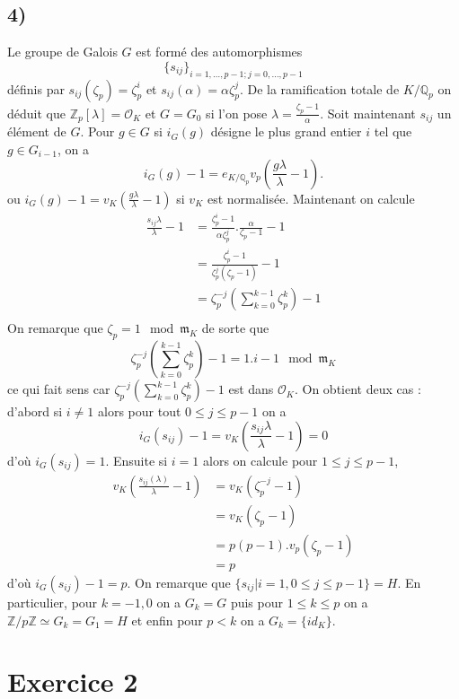 \documentclass[a4paper,12pt]{article}
\newcommand{\Z}{\mathbb{Z}}
\newcommand{\Q}{\mathbb{Q}}
\newcommand{\Or}{\mathcal{O}}
\newcommand{\m}{\mathfrak m}
\theoremstyle{plain}
\theoremstyle{definition}
\theoremstyle{remark}
\begin{document}
\subsection*{4)}
Le groupe de Galois $G$ est formé des automorphismes 
\[\{s_{ij}\}_{i=1,\ldots,p-1;j=0,\ldots,p-1}\]
définis par $s_{ij}(\zeta_p)=\zeta_p^i$ et 
$s_{ij}(\alpha)=\alpha\zeta_p^j$. De la ramification totale de 
$K/\Q_p$ on déduit que $\Z_p[\lambda]=\Or_K$ et $G=G_0$ si l'on
pose $\lambda=\frac{\zeta_p-1}{\alpha}$. Soit maintenant $s_{ij}$
un élément de $G$. Pour $g\in G$ si $i_G(g)$ désigne le plus
grand entier $i$ tel que $g\in G_{i-1}$, on a
\[i_G(g)-1=e_{K/\Q_p}v_p(\frac{g\lambda}{\lambda} -1).\]
ou $i_G(g)-1=v_K(\frac{g\lambda}{\lambda}-1)$ si $v_K$ est 
normalisée. Maintenant on calcule
\begin{align*}
  \frac{s_{ij}\lambda}{\lambda}-1&=\frac{\zeta_p^i-1}{\alpha\zeta_p^j}.\frac{\alpha}{\zeta_p-1}-1\\
				 &=\frac{\zeta_p^i-1}{\zeta_p^j(\zeta_p-1)}-1\\
				 &=\zeta_p^{-j}\left(\sum_{k=0}^{k-1}\zeta_p^k\right)-1\\
\end{align*}
On remarque que $ \zeta_p=1\mod \m_K$ de sorte que  
\[\zeta_p^{-j}\left(\sum_{k=0}^{k-1}\zeta_p^k\right)-1=1.i-1\mod \m_K\]
ce qui fait sens car 
$\zeta_p^{-j}\left(\sum_{k=0}^{k-1}\zeta_p^k\right)-1$ est dans 
$\Or_K$. On obtient deux cas : d'abord si $i\ne 1$ alors 
pour tout $0\leq j\leq p-1$  on a 
\[i_G(s_{ij})-1=v_K(\frac{s_{ij}\lambda}{\lambda}-1)=0\]
d'où $i_G(s_{ij})=1$. Ensuite si $i=1$ alors on calcule pour
$1\leq j\leq p-1$,
\begin{align*}
v_K\left(\frac{s_{ij}(\lambda)}{\lambda}-1\right)&=v_K\left(\zeta_p^{-j}-1\right)\\
				      &=v_K\left(\zeta_p-1\right)\\
				      &=p(p-1).v_p\left(\zeta_p-1\right)\\
				      &=p
\end{align*}
d'où $i_G(s_{ij})-1=p$. On remarque que $\{s_{ij}|i=1,0\leq j\leq p-1\}=H$. En particulier, pour $k=-1,0$ on a 
$G_k=G$ puis pour $1\leq k\leq p$ on a $\Z/p\Z\simeq G_k=G_1=H$
et enfin pour $p<k$ on a $G_k=\{id_K\}$.

\section*{Exercice 2}
\end{document}
